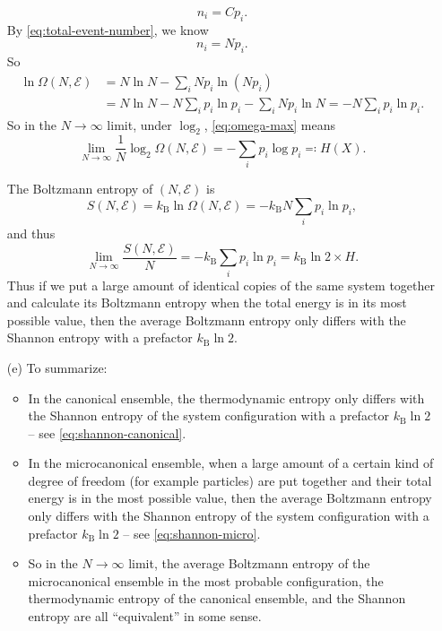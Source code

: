 \documentclass[hyperref, a4paper]{article}
\begin{document}
\begin{itemize}
\[    n_i = C p_i.
\]
By \eqref{eq:total-event-number}, we know 
\begin{equation}
    n_i = N p_i.
\end{equation}
So 
\begin{equation}
    \begin{aligned}
        \ln \Omega(N, \mathcal{E}) &= N \ln N - \sum_i N p_i \ln (N p_i) \\
        &= N \ln N - N \sum_i p_i \ln p_i - \sum_i N p_i \ln N = - N \sum_i p_i \ln p_i.
    \end{aligned}
    \label{eq:omega-max}
\end{equation}
So in the $N \to \infty$ limit, under $\log_2$, \eqref{eq:omega-max} means  
\begin{equation}
    \lim_{N \to \infty } \frac{1}{N} \log_2 \Omega(N, \mathcal{E}) = - \sum_i p_i \log p_i \eqqcolon H(X).
\end{equation}

The Boltzmann entropy of $(N, \mathcal{E})$ is 
\begin{equation}
    S(N, \mathcal{E}) = k_{\text{B}} \ln \Omega(N, \mathcal{E}) = - k_{\text{B}} N \sum_i p_i \ln p_i,
\end{equation}
and thus 
\begin{equation}
    \lim_{N \to \infty} \frac{S(N, \mathcal{E})}{N} = - k_{\text{B}} \sum_{i} p_i \ln p_i 
    = k_{\text{B}} \ln 2 \times H.
    \label{eq:shannon-micro}
\end{equation}
Thus if we put a large amount of identical copies of the same system together 
and calculate its Boltzmann entropy when the total energy is in its most possible value,
then the average Boltzmann entropy only differs with the Shannon entropy with a prefactor $k_{\text{B}} \ln 2$.

\item[(e)] To summarize:
\begin{itemize}
    \item In the canonical ensemble, the thermodynamic entropy 
    only differs with the Shannon entropy of the system configuration 
    with a prefactor $k_{\text{B}} \ln 2$ -- see \eqref{eq:shannon-canonical}.
    \item In the microcanonical ensemble, when a large amount of a certain kind of degree of freedom 
    (for example particles) are put together 
    and their total energy is in the most possible value, 
    then the average Boltzmann entropy only differs with the Shannon entropy of the system configuration 
    with a prefactor $k_{\text{B}} \ln 2$ -- see \eqref{eq:shannon-micro}. 
    \item So in the $N \to \infty$ limit, 
    the average Boltzmann entropy of the microcanonical ensemble 
    in the most probable configuration, 
    the thermodynamic entropy of the canonical ensemble,
    and the Shannon entropy 
    are all ``equivalent'' in some sense.
\end{itemize}


\end{itemize}
\end{document}
